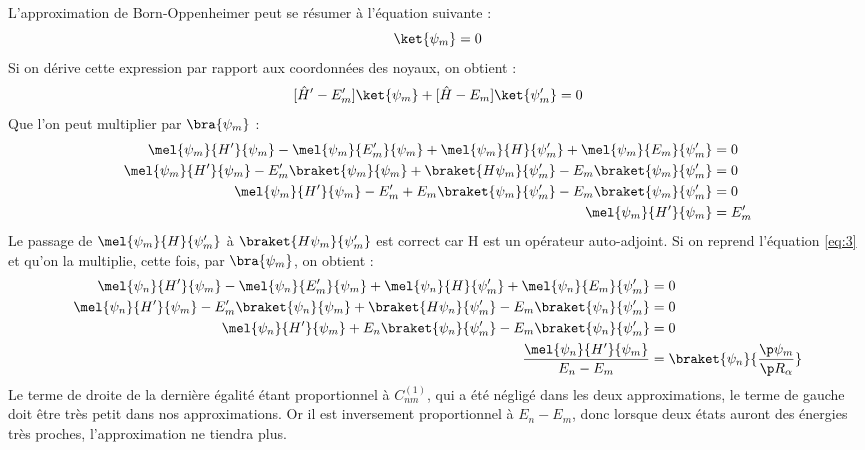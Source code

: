 L'approximation de Born-Oppenheimer peut se résumer à l'équation suivante : 
\begin{equation*}
    [\hat{H}-E_m]\ket{\psi_m} = 0
\end{equation*}
Si on dérive cette expression par rapport aux coordonnées des noyaux, on obtient : 
\begin{equation}\label{eq:3}
    [\hat{H}'-E_m']\ket{\psi_m} + [\hat{H}-E_m]\ket{\psi_m'} = 0
\end{equation}
Que l'on peut multiplier par $\bra{\psi_m}$ : 
\begin{equation*}
\begin{split}
    \mel{\psi_m}{H'}{\psi_m} - \mel{\psi_m}{E_m'}{\psi_m} + \mel{\psi_m}{H}{\psi_m'} + \mel{\psi_m}{E_m}{\psi_m'} & = 0 \\
    \mel{\psi_m}{H'}{\psi_m} - E_m'\braket{\psi_m}{\psi_m} + \braket{H\psi_m}{\psi_m'} - E_m \braket{\psi_m}{\psi_m'} & = 0 \\
    \mel{\psi_m}{H'}{\psi_m} - E_m' + E_m\braket{\psi_m}{\psi_m'} - E_m \braket{\psi_m}{\psi_m'} & = 0 \\
    \mel{\psi_m}{H'}{\psi_m} & = E_m'
    \end{split}
\end{equation*}
Le passage de $\mel{\psi_m}{H}{\psi_m'}$ à $\braket{H\psi_m}{\psi_m'}$ est correct car H est un opérateur auto-adjoint.\newline
Si on reprend l'équation \ref{eq:3} et qu'on la multiplie, cette fois, par $\bra{\psi_m}$, on obtient : 
\begin{equation*}
    \begin{split}
        \mel{\psi_n}{H'}{\psi_m} - \mel{\psi_n}{E_m'}{\psi_m} + \mel{\psi_n}{H}{\psi_m'} + \mel{\psi_n}{E_m}{\psi_m'} & = 0 \\
        \mel{\psi_n}{H'}{\psi_m} - E_m'\braket{\psi_n}{\psi_m} + \braket{H\psi_n}{\psi_m'} - E_m \braket{\psi_n}{\psi_m'} & = 0 \\
        \mel{\psi_n}{H'}{\psi_m} + E_n\braket{\psi_n}{\psi_m'} - E_m \braket{\psi_n}{\psi_m'} & = 0 \\
        \frac{\mel{\psi_n}{H'}{\psi_m}}{E_n-E_m} & = \braket{\psi_n}{\frac{\p\psi_m}{\p R_{\alpha}}}
    \end{split}
\end{equation*}
Le terme de droite de la dernière égalité étant proportionnel à $C_{nm}^{(1)}$, qui a été négligé dans les deux approximations, le terme de gauche doit être très petit dans nos approximations. Or il est inversement proportionnel à $E_n-E_m$, donc lorsque deux états auront des énergies très proches, l'approximation ne tiendra plus.\newline
